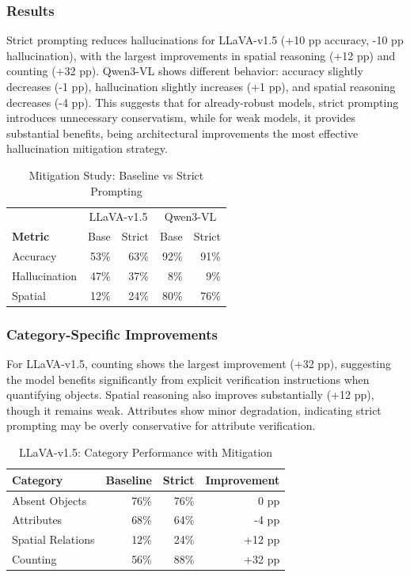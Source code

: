 \documentclass[11pt,a4paper]{article}
\begin{document}
\subsubsection{Results}

Strict prompting reduces hallucinations for LLaVA-v1.5 (+10 pp accuracy, -10 pp hallucination), with the largest improvements in spatial reasoning (+12 pp) and counting (+32 pp). Qwen3-VL shows different behavior: accuracy slightly decreases (-1 pp), hallucination slightly increases (+1 pp), and spatial reasoning decreases (-4 pp). This suggests that for already-robust models, strict prompting introduces unnecessary conservatism, while for weak models, it provides substantial benefits, being architectural improvements the most effective hallucination mitigation strategy.

\vspace{10pt}
\begin{table}[h]
\centering
\begin{tabular}{lrr|rr}
\toprule
& \multicolumn{2}{c|}{LLaVA-v1.5} & \multicolumn{2}{c}{Qwen3-VL} \\
\textbf{Metric} & Base & Strict & Base & Strict \\
\midrule
Accuracy & 53\% & 63\% & 92\% & 91\% \\
Hallucination & 47\% & 37\% & 8\% & 9\% \\
Spatial & 12\% & 24\% & 80\% & 76\% \\
\bottomrule
\end{tabular}
\caption{Mitigation Study: Baseline vs Strict Prompting}
\end{table}

\subsubsection{Category-Specific Improvements}

For LLaVA-v1.5, counting shows the largest improvement (+32 pp), suggesting the model benefits significantly from explicit verification instructions when quantifying objects. Spatial reasoning also improves substantially (+12 pp), though it remains weak. Attributes show minor degradation, indicating strict prompting may be overly conservative for attribute verification.

\begin{table}[H]
\centering
\begin{tabular}{lrrr}
\toprule
\textbf{Category} & \textbf{Baseline} & \textbf{Strict} & \textbf{Improvement} \\
\midrule
Absent Objects & 76\% & 76\% & 0 pp \\
Attributes & 68\% & 64\% & -4 pp \\
Spatial Relations & 12\% & 24\% & +12 pp \\
Counting & 56\% & 88\% & +32 pp \\
\bottomrule
\end{tabular}
\caption{LLaVA-v1.5: Category Performance with Mitigation}
\end{table}
\end{document}
